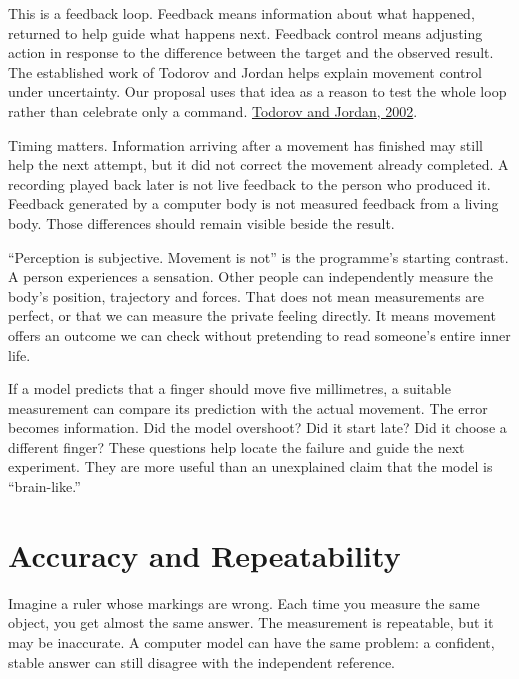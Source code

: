 This is a feedback loop. Feedback means information about what happened, returned to help guide what happens next. Feedback control means adjusting action in response to the difference between the target and the observed result. The established work of Todorov and Jordan helps explain movement control under uncertainty. Our proposal uses that idea as a reason to test the whole loop rather than celebrate only a command. \href{https://www.nature.com/articles/nn963}{Todorov and Jordan, 2002}.\par

Timing matters. Information arriving after a movement has finished may still help the next attempt, but it did not correct the movement already completed. A recording played back later is not live feedback to the person who produced it. Feedback generated by a computer body is not measured feedback from a living body. Those differences should remain visible beside the result.\par

``Perception is subjective. Movement is not'' is the programme's starting contrast. A person experiences a sensation. Other people can independently measure the body's position, trajectory and forces. That does not mean measurements are perfect, or that we can measure the private feeling directly. It means movement offers an outcome we can check without pretending to read someone's entire inner life.\par

If a model predicts that a finger should move five millimetres, a suitable measurement can compare its prediction with the actual movement. The error becomes information. Did the model overshoot? Did it start late? Did it choose a different finger? These questions help locate the failure and guide the next experiment. They are more useful than an unexplained claim that the model is ``brain-like.''\par

\section{Accuracy and Repeatability}

Imagine a ruler whose markings are wrong. Each time you measure the same object, you get almost the same answer. The measurement is repeatable, but it may be inaccurate. A computer model can have the same problem: a confident, stable answer can still disagree with the independent reference.\par

